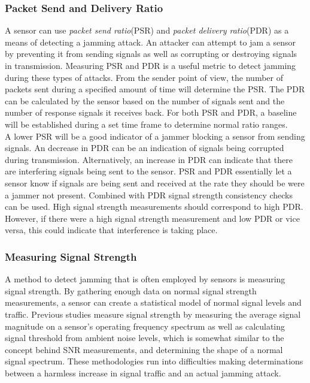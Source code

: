 \documentclass[conference]{IEEEtran}
\begin{document}
\subsubsection{Packet Send and Delivery Ratio}
A sensor can use \textit{packet send ratio}(PSR) and \textit{packet delivery ratio}(PDR) as a means of detecting a jamming attack\cite{12}. An attacker can attempt to jam a sensor by preventing it from sending signals as well as corrupting or destroying signals in transmission\cite{12}\cite{7}. Measuring PSR and PDR is a useful metric to detect jamming during these types of attacks. From the sender point of view, the number of packets sent during a specified amount of time will determine the PSR. The PDR can be calculated by the sensor based on the number of signals sent and the number of response signals it receives back. For both PSR and PDR, a baseline will be established during a set time frame to determine normal ratio ranges. \\
\indent A lower PSR will be a good indicator of a jammer blocking a sensor from sending signals. An decrease in PDR can be an indication of signals being corrupted during transmission. Alternatively, an increase in PDR can indicate that there are interfering signals being sent to the sensor. PSR and PDR essentially let a sensor know if signals are being sent and received at the rate they should be were a jammer not present\cite{12}\cite{7}. Combined with PDR signal strength consistency checks can be used\cite{7}. High signal strength measurements should correspond to high PDR. However, if there were a high signal strength measurement and low PDR or vice versa, this could indicate that interference is taking place\cite{7}.
\subsubsection{Measuring Signal Strength}
A method to detect jamming that is often employed by sensors is measuring signal strength\cite{12}. By gathering enough data on normal signal strength measurements, a sensor can create a statistical model of normal signal levels and traffic\cite{7}. Previous studies measure signal strength by measuring the average signal magnitude on a sensor's operating frequency spectrum as well as calculating signal threshold from ambient noise levels, which is somewhat similar to the concept behind SNR measurements, and determining the shape of a normal signal spectrum\cite{12}\cite{7}. These methodologies run into difficulties making determinations between a harmless increase in signal traffic and an actual jamming attack. 
\end{document}
